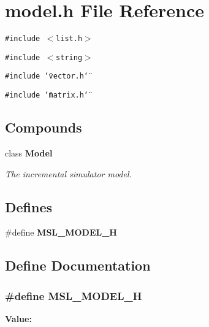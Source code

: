 \section{model.h File Reference}
\label{model_8h}
{\tt \#include $<$list.h$>$}\par
{\tt \#include $<$string$>$}\par
{\tt \#include \char`\"{}vector.h\char`\"{}}\par
{\tt \#include \char`\"{}matrix.h\char`\"{}}\par
\subsection*{Compounds}
\begin{CompactItemize}
\item 
class {\bf Model}
\begin{CompactList}\small\item\em The incremental simulator model.\item\end{CompactList}\end{CompactItemize}
\subsection*{Defines}
\begin{CompactItemize}
\item 
\#define {\bf MSL\_\-MODEL\_\-H}
\end{CompactItemize}


\subsection{Define Documentation}
\subsubsection{\setlength{\rightskip}{0pt plus 5cm}\#define MSL\_\-MODEL\_\-H}\label{model_8h_a0}


{\bf Value:}\footnotesize\begin{verbatim}
\end{verbatim}\normalsize 
